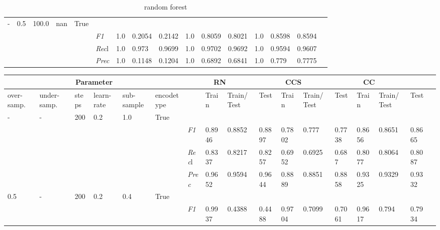 \begin{table}[]
\begin{tabularx}{\textwidth}{XXXXX|X|XXX|XXX|XXXX}
    - & 0.5 & 100.0 & nan & True& & & & & & & & & \\
    & & & & & \textit{F1} & 1.0 & 0.2054 & 0.2142 & 1.0 & 0.8059        & 0.8021        & 1.0        & 0.8598        & 0.8594        \\
    & & & & & \textit{Rec}l & 1.0 & 0.973 & 0.9699    & 1.0 & 0.9702    & 0.9692    & 1.0    & 0.9594    & 0.9607    \\
    & & & & & \textit{Prec} & 1.0 & 0.1148 & 0.1204 & 1.0 & 0.6892 & 0.6841 & 1.0 & 0.779 & 0.7775 \\ \midrule
    \end{tabularx}
    \caption{random forest}
    \label{tab:all_results_random_forest}
    \end{table}
    
    \begin{table}[]
    \tiny
    \tabcolsep=0.11cm
    \begin{tabularx}{\textwidth}{XXXXXX|X|XXX|XXX|XXXX}
    \toprule
    \multicolumn{6}{c}{Parameter} & \multicolumn{3}{c}{RN} & \multicolumn{3}{c}{CCS} & \multicolumn{3}{c}{CC} \\ \midrule
    over-\newline samp. & under-\newline samp. & steps &learn-\newline rate & sub-\newline sample & encode\newline type & & Train & Train/\newline Test & Test & Train & Train/\newline Test & Test & Train & Train/\newline Test & Test \\ \midrule
    - & - & 200 & 0.2 & 1.0 &True & & & & & & & & & \\
    & & & & & & \textit{F1} & 0.8946 & 0.8852 & 0.8897 & 0.7802 & 0.777        & 0.7738        & 0.8656        & 0.8651        & 0.8665        \\
    & & & & & & \textit{Rec}l & 0.8337 & 0.8217 & 0.8257    & 0.6952 & 0.6925    & 0.687    & 0.8077    & 0.8064    & 0.8087    \\
    & & & & & & \textit{Prec} & 0.9652 & 0.9594 & 0.9644 & 0.8889 & 0.8851 & 0.8858 & 0.9325 & 0.9329 & 0.9332 \\ \midrule
    0.5 & - & 200 & 0.2 & 0.4 &True & & & & & & & & & \\
    & & & & & & \textit{F1} & 0.9937 & 0.4388 & 0.4488 & 0.9704 & 0.7099        & 0.7061        & 0.9617        & 0.794        & 0.7934        \\

\end{tabularx}
\end{table}
